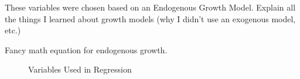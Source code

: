 These variables were chosen based on an Endogenous Growth Model.
Explain all the things I learned about growth models (why I didn't use an
exogenous model, etc.)

Fancy math equation for endogenous growth.

\begin{figure}[!ht]
\begin{center}
\caption{Variables Used in Regression}

\end{center}
\end{figure}
